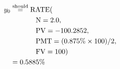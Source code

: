 \begin{align*}
y_{0}&\overset{\text{should}}{=}\text{RATE}(\\
	&\hspace{.5in}\text{N}=2.0,\\
	&\hspace{.5in}\text{PV}=-100.2852,\\
	&\hspace{.5in}\text{PMT}=(0.875\%\times 100)/2,\\
	&\hspace{.5in}\text{FV}=100)\\
	&=0.5885\%
\end{align*}
